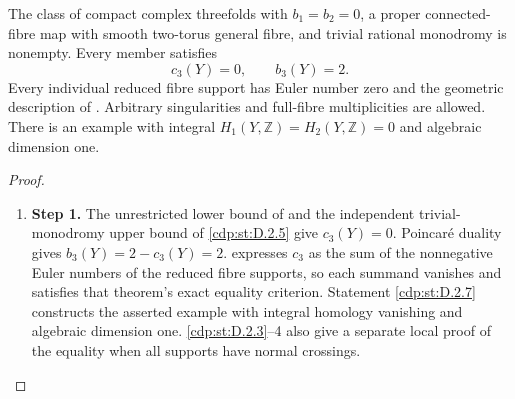 \begin{proposition}\hypertarget{tag-01G9}{}\label{cdp:st:D.2.2}

The class of compact complex threefolds with $b_1=b_2=0$,
a proper connected-fibre map with smooth two-torus general fibre,
and trivial rational monodromy is nonempty. Every member satisfies
\[
                   c_3(Y)=0,\qquad b_3(Y)=2.
\]
Every individual reduced fibre support has Euler number zero and
the geometric description of . Arbitrary singularities and
full-fibre multiplicities are allowed. There is an example with
integral $H_1(Y,\mathbb Z)=H_2(Y,\mathbb Z)=0$ and
algebraic dimension one.
\end{proposition}


\begin{proof}
\begin{enumerate}[label={$\langle1\rangle$\arabic*.},leftmargin=*]
\item 
\noindent\textbf{Step 1.} The unrestricted lower bound of  and the independent
trivial-monodromy upper bound of \ref{cdp:st:D.2.5} give $c_3(Y)=0$.
Poincar\'e duality gives $b_3(Y)=2-c_3(Y)=2$.
 expresses $c_3$ as the sum of the nonnegative
Euler numbers of the reduced fibre supports, so each summand
vanishes and satisfies that theorem's exact equality criterion.
Statement \ref{cdp:st:D.2.7} constructs the asserted example with integral
homology vanishing and algebraic dimension one. \ref{cdp:st:D.2.3}--4 also
give a separate local proof of the equality when all supports
have normal crossings.

\end{enumerate}
\end{proof}